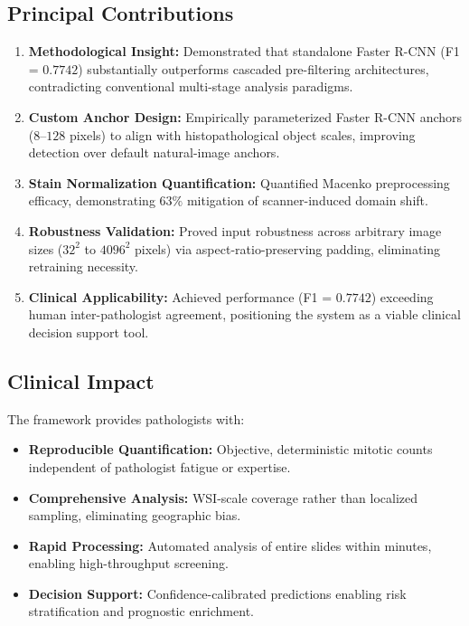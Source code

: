 \documentclass[journal]{IEEEtran}
\begin{document}
\subsection{Principal Contributions}
\begin{enumerate}
\item \textbf{Methodological Insight:} Demonstrated that standalone Faster R-CNN (F1 = $0.7742$) substantially outperforms cascaded pre-filtering architectures, contradicting conventional multi-stage analysis paradigms.

\item \textbf{Custom Anchor Design:} Empirically parameterized Faster R-CNN anchors ($8$--$128$ pixels) to align with histopathological object scales, improving detection over default natural-image anchors.

\item \textbf{Stain Normalization Quantification:} Quantified Macenko preprocessing efficacy, demonstrating $63\%$ mitigation of scanner-induced domain shift.

\item \textbf{Robustness Validation:} Proved input robustness across arbitrary image sizes ($32^2$ to $4096^2$ pixels) via aspect-ratio-preserving padding, eliminating retraining necessity.

\item \textbf{Clinical Applicability:} Achieved performance (F1 = $0.7742$) exceeding human inter-pathologist agreement, positioning the system as a viable clinical decision support tool.
\end{enumerate}

\subsection{Clinical Impact}
The framework provides pathologists with:
\begin{itemize}
\item \textbf{Reproducible Quantification:} Objective, deterministic mitotic counts independent of pathologist fatigue or expertise.
\item \textbf{Comprehensive Analysis:} WSI-scale coverage rather than localized sampling, eliminating geographic bias.
\item \textbf{Rapid Processing:} Automated analysis of entire slides within minutes, enabling high-throughput screening.
\item \textbf{Decision Support:} Confidence-calibrated predictions enabling risk stratification and prognostic enrichment.
\end{itemize}
\end{document}
